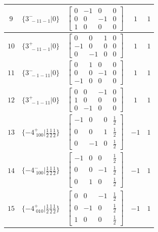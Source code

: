 \documentclass[fleqn,8pt]{jsarticle}
\begin{document}
\begin{longtable}{ccccc}
$ 9 $ & $ \{3^{-}_{\,\,-11-1}|0\} $ & $ \begin{bmatrix} 0 & -1 & 0 & 0 \\ 0 & 0 & -1 & 0 \\ 1 & 0 & 0 & 0 \end{bmatrix} $ & $ 1 $ & $ 1 $ \\ \hline
$ 10 $ & $ \{3^{+}_{\,\,-11-1}|0\} $ & $ \begin{bmatrix} 0 & 0 & 1 & 0 \\ -1 & 0 & 0 & 0 \\ 0 & -1 & 0 & 0 \end{bmatrix} $ & $ 1 $ & $ 1 $ \\ \hline
$ 11 $ & $ \{3^{-}_{\,\,-1-11}|0\} $ & $ \begin{bmatrix} 0 & 1 & 0 & 0 \\ 0 & 0 & -1 & 0 \\ -1 & 0 & 0 & 0 \end{bmatrix} $ & $ 1 $ & $ 1 $ \\ \hline
$ 12 $ & $ \{3^{+}_{\,\,-1-11}|0\} $ & $ \begin{bmatrix} 0 & 0 & -1 & 0 \\ 1 & 0 & 0 & 0 \\ 0 & -1 & 0 & 0 \end{bmatrix} $ & $ 1 $ & $ 1 $ \\ \hline
$ 13 $ & $ \{-4^{+}_{\,\,100}|\frac{1}{2} \frac{1}{2} \frac{1}{2}\} $ & $ \begin{bmatrix} -1 & 0 & 0 & \frac{1}{2} \\ 0 & 0 & 1 & \frac{1}{2} \\ 0 & -1 & 0 & \frac{1}{2} \end{bmatrix} $ & $ -1 $ & $ 1 $ \\ \hline
$ 14 $ & $ \{-4^{-}_{\,\,100}|\frac{1}{2} \frac{1}{2} \frac{1}{2}\} $ & $ \begin{bmatrix} -1 & 0 & 0 & \frac{1}{2} \\ 0 & 0 & -1 & \frac{1}{2} \\ 0 & 1 & 0 & \frac{1}{2} \end{bmatrix} $ & $ -1 $ & $ 1 $ \\ \hline
$ 15 $ & $ \{-4^{+}_{\,\,010}|\frac{1}{2} \frac{1}{2} \frac{1}{2}\} $ & $ \begin{bmatrix} 0 & 0 & -1 & \frac{1}{2} \\ 0 & -1 & 0 & \frac{1}{2} \\ 1 & 0 & 0 & \frac{1}{2} \end{bmatrix} $ & $ -1 $ & $ 1 $ \\ \hline

\end{longtable}
\end{document}

